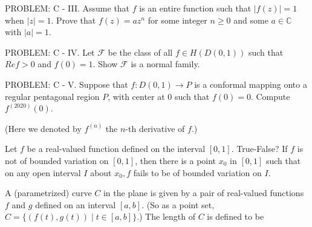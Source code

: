 \documentclass[14pt]{extarticle}
\begin{document}
\newpage
PROBLEM: C - III. Assume that $f$ is an entire function such that $|f(z)|=1$ when $|z|=1$. Prove that $f(z)=a z^{n}$ for some integer $n \geq 0$ and some $a \in \mathbb{C}$ with $|a|=1$.



\newpage
PROBLEM: C - IV. Let $\mathcal{F}$ be the class of all $f \in H(D(0,1))$ such that $R e f>0$ and $f(0)=1$. Show $\mathcal{F}$ is a normal family.




\newpage
PROBLEM: C - V. Suppose that $f: D(0,1) \rightarrow P$ is a conformal mapping onto a regular pentagonal region $P$, with center at 0 such that $f(0)=0$. Compute $f^{(2020)}(0)$.

(Here we denoted by $f^{(n)}$ the $n$-th derivative of $f$.)




\newpage

Let $f$ be a real-valued function defined on the interval $[0,1]$. True-False? If $f$ is not of bounded variation on $[0,1]$, then there is a point $x_{0}$ in $[0,1]$ such that on any open interval $I$ about $x_{0}, f$ fails to be of bounded variation on $I$.
\newpage

A (parametrized) curve $C$ in the plane is given by a pair of real-valued functions $f$ and $g$ defined on an interval $[a, b]$. (So as a point set, $C=\{(f(t), g(t)) \mid t \in[a, b]\}$.) The length of $C$ is defined to be
\end{document}
